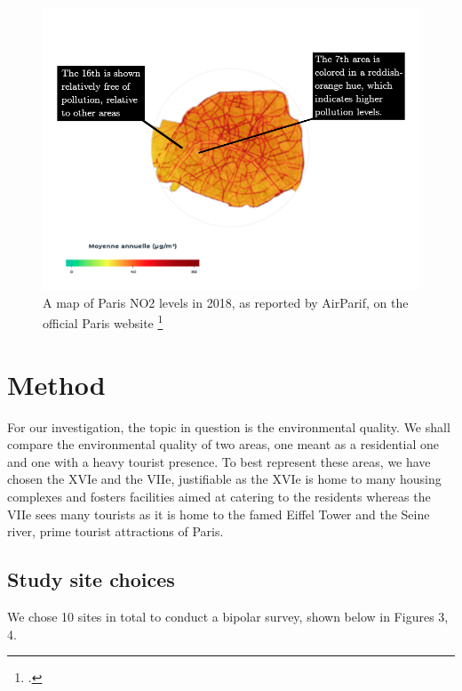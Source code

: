 \documentclass[11pt,letterpaper]{article}
\begin{document}
\begin{figure}[h!]
    \begin{minipage}{\textwidth}
        \centering
        \includegraphics[width=0.7\linewidth]{media/no2_map.png}
        \caption{A map of Paris NO2 levels in 2018, as reported by AirParif, on the official Paris website \protect\footcite{paris_air_qual}}
    \end{minipage}
\end{figure}


\section{Method}


For our investigation, the topic in question is the environmental quality. We shall compare the environmental quality of two areas, one meant as a residential one and one with a heavy tourist presence. To best represent these areas, we have chosen the XVIe and the VIIe, justifiable as the XVIe is home to many housing complexes and fosters facilities aimed at catering to the residents whereas the VIIe sees many tourists as it is home to the famed Eiffel Tower and the Seine river, prime tourist attractions of Paris.

\subsection{Study site choices}

We chose 10 sites in total to conduct a bipolar survey, shown below in Figures 3, 4.
\end{document}
